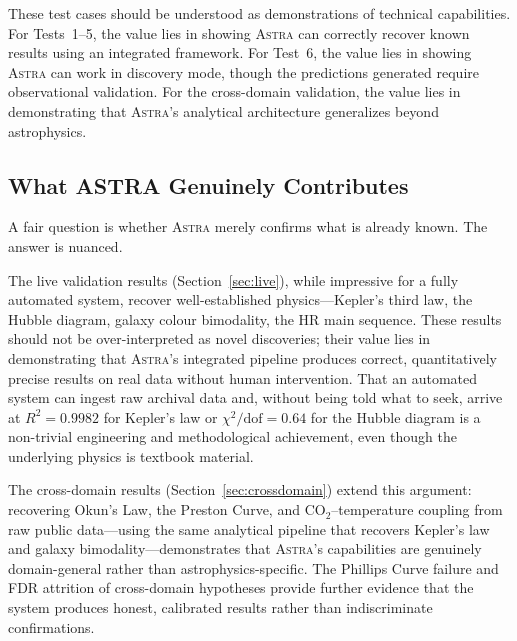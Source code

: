 \documentclass[usenatbib]{rasti}
\newcommand{\astra}{\textsc{Astra}\xspace}
\begin{document}
These test cases should be understood as demonstrations of technical capabilities.
For Tests~1--5, the value lies in showing \astra can correctly recover known results using an integrated framework.
For Test~6, the value lies in showing \astra can work in discovery mode, though the predictions generated require observational validation.
For the cross-domain validation, the value lies in demonstrating that \astra's analytical architecture generalizes beyond astrophysics.

\subsection{What ASTRA Genuinely Contributes}
\label{sec:discussion:contributions}

A fair question is whether \astra merely confirms what is already known.
The answer is nuanced.

The live validation results (Section~\ref{sec:live}), while impressive for a fully automated system, recover well-established physics---Kepler's third law, the Hubble diagram, galaxy colour bimodality, the HR main sequence.
These results should not be over-interpreted as novel discoveries; their value lies in demonstrating that \astra's integrated pipeline produces correct, quantitatively precise results on real data without human intervention.
That an automated system can ingest raw archival data and, without being told what to seek, arrive at $R^{2}=0.9982$ for Kepler's law or $\chi^{2}/\mathrm{dof}=0.64$ for the Hubble diagram is a non-trivial engineering and methodological achievement, even though the underlying physics is textbook material.

The cross-domain results (Section~\ref{sec:crossdomain}) extend this argument: recovering Okun's Law, the Preston Curve, and CO$_{2}$--temperature coupling from raw public data---using the same analytical pipeline that recovers Kepler's law and galaxy bimodality---demonstrates that \astra's capabilities are genuinely domain-general rather than astrophysics-specific.
The Phillips Curve failure and FDR attrition of cross-domain hypotheses provide further evidence that the system produces honest, calibrated results rather than indiscriminate confirmations.
\end{document}
